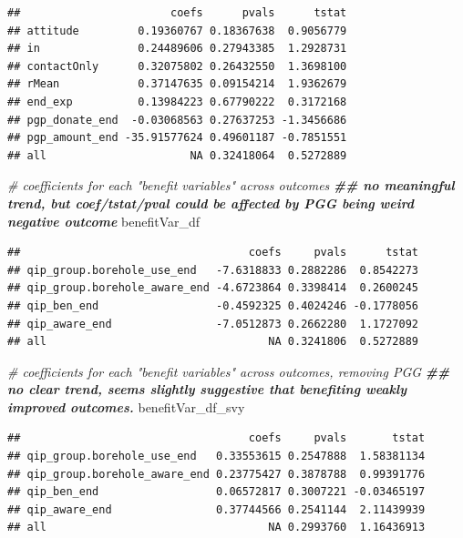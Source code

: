 \documentclass[
]{article}
\newenvironment{Shaded}{\begin{snugshade}}{\end{snugshade}}
\newcommand{\CommentTok}[1]{\textcolor[rgb]{0.56,0.35,0.01}{\textit{#1}}}
\newcommand{\DocumentationTok}[1]{\textcolor[rgb]{0.56,0.35,0.01}{\textbf{\textit{#1}}}}
\newcommand{\NormalTok}[1]{#1}
\begin{document}
\begin{verbatim}
##                       coefs      pvals      tstat
## attitude         0.19360767 0.18367638  0.9056779
## in               0.24489606 0.27943385  1.2928731
## contactOnly      0.32075802 0.26432550  1.3698100
## rMean            0.37147635 0.09154214  1.9362679
## end_exp          0.13984223 0.67790222  0.3172168
## pgp_donate_end  -0.03068563 0.27637253 -1.3456686
## pgp_amount_end -35.91577624 0.49601187 -0.7851551
## all                      NA 0.32418064  0.5272889
\end{verbatim}

\begin{Shaded}
\begin{Highlighting}[]
\CommentTok{\# coefficients for each "benefit variables" across outcomes}
\DocumentationTok{\#\# no meaningful trend, but coef/tstat/pval could be affected by PGG being weird negative outcome}
\NormalTok{benefitVar\_df}
\end{Highlighting}
\end{Shaded}

\begin{verbatim}
##                                   coefs     pvals      tstat
## qip_group.borehole_use_end   -7.6318833 0.2882286  0.8542273
## qip_group.borehole_aware_end -4.6723864 0.3398414  0.2600245
## qip_ben_end                  -0.4592325 0.4024246 -0.1778056
## qip_aware_end                -7.0512873 0.2662280  1.1727092
## all                                  NA 0.3241806  0.5272889
\end{verbatim}

\begin{Shaded}
\begin{Highlighting}[]
\CommentTok{\# coefficients for each "benefit variables" across outcomes, removing PGG}
\DocumentationTok{\#\# no clear trend, seems slightly suggestive that benefiting weakly improved outcomes.}
\NormalTok{benefitVar\_df\_svy}
\end{Highlighting}
\end{Shaded}

\begin{verbatim}
##                                   coefs     pvals       tstat
## qip_group.borehole_use_end   0.33553615 0.2547888  1.58381134
## qip_group.borehole_aware_end 0.23775427 0.3878788  0.99391776
## qip_ben_end                  0.06572817 0.3007221 -0.03465197
## qip_aware_end                0.37744566 0.2541144  2.11439939
## all                                  NA 0.2993760  1.16436913
\end{verbatim}
\end{document}
